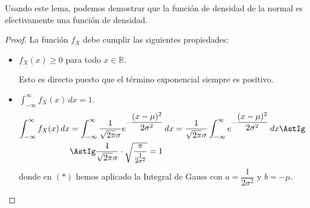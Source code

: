 Usando este lema, podemos demostrar que la función de densidad de la normal es efectivamente una función de densidad.
\begin{proof}
    La función $f_X$ debe cumplir las siguientes propiedades:
    \begin{itemize}
        \item $f_X(x)\geq 0$ para todo $x\in \mathbb{R}$.
        
        Esto es directo puesto que el término exponencial siempre es positivo.
        
        \item $\displaystyle \int_{-\infty}^{\infty} f_X(x) \, dx = 1$.
        \begin{align*}
            \int_{-\infty}^{\infty} f_X(x) \, dx &= \int_{-\infty}^{\infty} \dfrac{1}{\sqrt{2\pi}\sigma} e^{-\dfrac{(x-\mu)^2}{2\sigma^2}} \, dx = \dfrac{1}{\sqrt{2\pi}\sigma} \int_{-\infty}^{\infty} e^{-\dfrac{(x-\mu)^2}{2\sigma^2}} \, dx \AstIg\\
            &\AstIg \dfrac{1}{\sqrt{2\pi}\sigma} \cdot \sqrt{\dfrac{\pi}{\frac{1}{2\sigma^2}}} = 1
        \end{align*}
        donde en $(\ast)$ hemos aplicado la Integral de Gauss con $a=\dfrac{1}{2\sigma^2}$ y $b=-\mu$.
    \end{itemize}
\end{proof}


